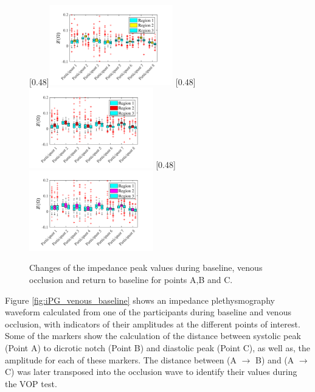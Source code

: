 \begin{figure}[!htbp]
	\null\hfill%
	[0.48\textwidth]{\includegraphics[width=0.48\textwidth, trim={0.5cm 0cm 1.5cm 0 cm}, clip]{figure_apa_3a}}%
	\hfill%
	[0.48\textwidth]{\includegraphics[width=0.48\textwidth, trim={0.5cm 0cm 1.5cm 0 cm}, clip]{figure_apa_3b}}%
	\hfill%
	[0.48\textwidth]{\includegraphics[width=0.48\textwidth, trim={0.5cm 0cm 1.5cm 0 cm}, clip]{figure_apa_3c}}%
	\null%
	\caption{Changes of the impedance peak values during baseline, venous occlusion and return to baseline for points A,B and C.}
	\label{fig:iPG change points venous}
\end{figure}

Figure \ref{fig:iPG_venous_baseline} shows an impedance plethysmography waveform calculated from one of the participants during baseline and venous occlusion, with indicators of their amplitudes at the different points of interest. Some of the markers show the calculation of the distance between systolic peak (Point A) to dicrotic notch (Point B) and diastolic peak (Point C), as well as, the amplitude for each of these markers. The distance between (A $\rightarrow$ B) and (A $\rightarrow$ C) was later transposed into the occlusion wave to identify their values during the VOP test.

